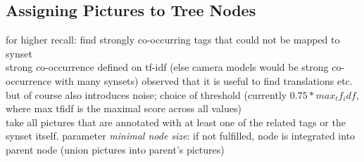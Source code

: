 \subsection{Assigning Pictures to Tree Nodes}
\label{sec_picturestonodes}
for higher recall: find strongly co-occurring tags that could not be mapped to synset \\
strong co-occurrence defined on tf-idf (else camera models would be strong co-occurrence with many synsets)
observed that it is useful to find translations etc. but of course also introduces noise; choice of threshold (currently $0.75 * max_tf_idf$, where max tfidf is the maximal score across all values) \\
take all pictures that are annotated with at least one of the related tags or the synset itself. parameter \emph{minimal node size}: if not fulfilled, node is integrated into parent node (union pictures into parent's pictures)
